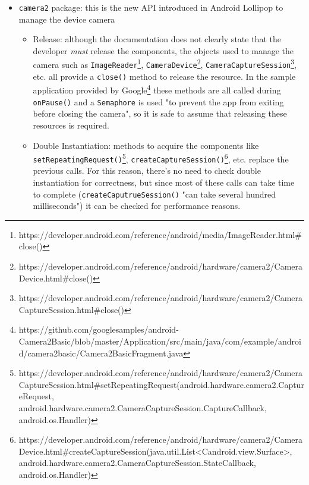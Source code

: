 \documentclass[11pt,a4paper,notitlepage]{article}
\begin{document}
\begin{itemize}
\begin{itemize}
\begin{itemize}
				\item Double Instantiation: if the developer tries to acquire the camera twice, the system will throw a runtime exception\footnote{https://developer.android.com/reference/android/hardware/Camera.html\#open(int)}.
			\end{itemize}
			\item \texttt{camera2} package: this is the new API introduced in Android Lollipop to manage the device camera
			\begin{itemize}
				\item Release: although the documentation does not clearly state that the developer \textit{must} release the components, the objects used to manage the camera such as \texttt{ImageReader}\footnote{https://developer.android.com/reference/android/media/ImageReader.html\#close()}, \texttt{CameraDevice}\footnote{https://developer.android.com/reference/android/hardware/camera2/CameraDevice.html\#close()}, \texttt{CameraCaptureSession}\footnote{https://developer.android.com/reference/android/hardware/camera2/CameraCaptureSession.html\#close()}, etc. all provide a \texttt{close()} method to release the resource. In the sample application provided by Google\footnote{https://github.com/googlesamples/android-Camera2Basic/blob/master/Application/src/main/java/com/example/android/camera2basic/Camera2BasicFragment.java} these methods are all called during \texttt{onPause()} and a \texttt{Semaphore} is used "to prevent the app from exiting before closing the camera", so it is safe to assume that releasing these resources is required.
				\item Double Instantiation: methods to acquire the components like \texttt{setRepeatingRequest()}\footnote{https://developer.android.com/reference/android/hardware/camera2/CameraCaptureSession.html\#setRepeatingRequest(android.hardware.camera2.CaptureRequest, android.hardware.camera2.CameraCaptureSession.CaptureCallback, android.os.Handler)}, \texttt{createCaptureSession()}\footnote{https://developer.android.com/reference/android/hardware/camera2/CameraDevice.html\#createCaptureSession(java.util.List<Candroid.view.Surface>, android.hardware.camera2.CameraCaptureSession.StateCallback, android.os.Handler)}, etc. replace the previous calls. For this reason, there's no need to check double instantiation for correctness, but since most of these calls can take time to complete (\texttt{createCaputrueSession()} "can take several hundred milliseconds") it can be checked for performance reasons.
			\end{itemize}

\end{itemize}
\end{itemize}
\end{document}
